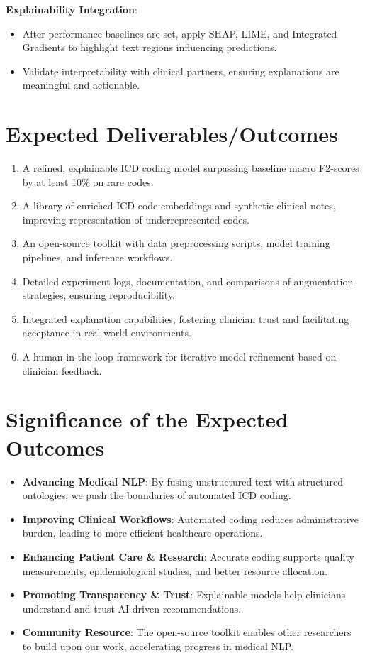 \documentclass[10pt,a4paper]{article}
\begin{document}
\textbf{Explainability Integration}:
\begin{itemize}
    \item After performance baselines are set, apply SHAP, LIME, and Integrated Gradients to highlight text regions influencing predictions.
    \item Validate interpretability with clinical partners, ensuring explanations are meaningful and actionable.
\end{itemize}

\section{Expected Deliverables/Outcomes}
\begin{enumerate}
    \item A refined, explainable ICD coding model surpassing baseline macro F2-scores by at least 10\% on rare codes.
    \item A library of enriched ICD code embeddings and synthetic clinical notes, improving representation of underrepresented codes.
    \item An open-source toolkit with data preprocessing scripts, model training pipelines, and inference workflows.
    \item Detailed experiment logs, documentation, and comparisons of augmentation strategies, ensuring reproducibility.
    \item Integrated explanation capabilities, fostering clinician trust and facilitating acceptance in real-world environments.
    \item A human-in-the-loop framework for iterative model refinement based on clinician feedback.
\end{enumerate}

\section{Significance of the Expected Outcomes}
\begin{itemize}
    \item \textbf{Advancing Medical NLP}: By fusing unstructured text with structured ontologies, we push the boundaries of automated ICD coding.
    \item \textbf{Improving Clinical Workflows}: Automated coding reduces administrative burden, leading to more efficient healthcare operations.
    \item \textbf{Enhancing Patient Care \& Research}: Accurate coding supports quality measurements, epidemiological studies, and better resource allocation.
    \item \textbf{Promoting Transparency \& Trust}: Explainable models help clinicians understand and trust AI-driven recommendations.
    \item \textbf{Community Resource}: The open-source toolkit enables other researchers to build upon our work, accelerating progress in medical NLP.
\end{itemize}
\end{document}
